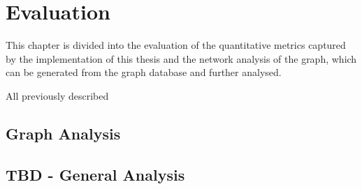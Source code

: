 \chapter{Evaluation}

This chapter is divided into the evaluation of the quantitative metrics captured by the implementation of this thesis and the network analysis of the graph, which can be generated from the graph database and further analysed.

All previously described



\section{Graph Analysis}
\section{TBD - General Analysis}